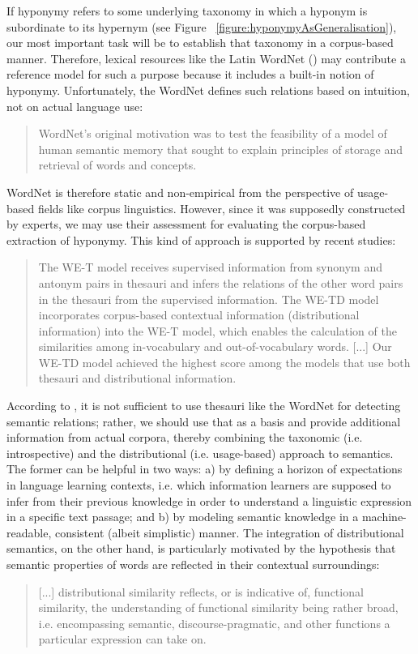 \documentclass[jou]{apa6} %
\begin{document}
If hyponymy refers to some underlying taxonomy in which a hyponym is subordinate to its hypernym (see Figure ~\ref{figure:hyponymyAsGeneralisation}), our most important task will be to establish that taxonomy in a corpus-based manner. Therefore, lexical resources like the Latin WordNet (\cite{minozziLatinWordNetProject2010}) may contribute a reference model for such a purpose because it includes a built-in notion of hyponymy. Unfortunately, the WordNet defines such relations based on intuition, not on actual language use:
\blockquote[{\cite[p.~315]{fellbaumChallengesMultilingualWordnet2012}}]{WordNet’s original motivation was to test the feasibility of a model of human semantic memory that sought to explain principles of storage and retrieval of words and concepts.}
WordNet is therefore static and non-empirical from the perspective of usage-based fields like corpus linguistics. However, since it was supposedly constructed by experts, we may use their assessment for evaluating the corpus-based extraction of hyponymy. This kind of approach is supported by recent studies:
\blockquote[{\cite[p.~984-988]{onoWordEmbeddingbasedAntonym2015}}]{The WE-T model receives supervised information from synonym and antonym pairs in thesauri and infers the relations of the other word pairs in the thesauri from the supervised information. The WE-TD model incorporates corpus-based contextual information (distributional information) into the WE-T model, which enables the calculation of the similarities among in-vocabulary and out-of-vocabulary words. [...] Our WE-TD model achieved the highest score among the models that use both thesauri and distributional information.}
According to \cite{onoWordEmbeddingbasedAntonym2015}, it is not sufficient to use thesauri like the WordNet for detecting semantic relations; rather, we should use that as a basis and provide additional information from actual corpora, thereby combining the taxonomic (i.e. introspective) and the distributional (i.e. usage-based) approach to semantics. The former can be helpful in two ways: a) by defining a horizon of expectations in language learning contexts, i.e. which information learners are supposed to infer from their previous knowledge in order to understand a linguistic expression in a specific text passage; and b) by modeling semantic knowledge in a machine-readable, consistent (albeit simplistic) manner. The integration of distributional semantics, on the other hand, is particularly motivated by the hypothesis that semantic properties of words are reflected in their contextual surroundings:
\blockquote[{\cite[p.~59]{griesBehavioralProfilesCorpusbased2009}}]{[...] distributional similarity reflects, or is indicative of, functional similarity, the understanding of functional similarity being rather broad, i.e. encompassing semantic, discourse-pragmatic, and other functions a particular expression can take on.}
\end{document}
